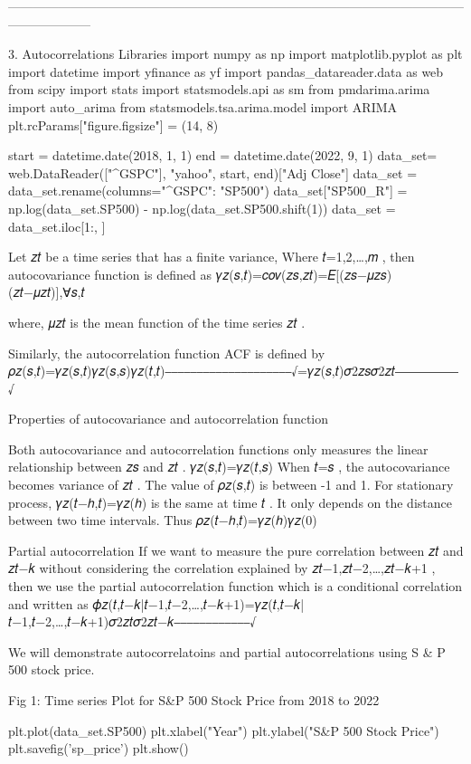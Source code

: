 --------------------------------------------------------------------------------------------------------------------------------


3. Autocorrelations
Libraries
import numpy as np import matplotlib.pyplot as plt import datetime import yfinance as yf import pandas_datareader.data as web from scipy import stats import statsmodels.api as sm from pmdarima.arima import auto_arima from statsmodels.tsa.arima.model import ARIMA plt.rcParams["figure.figsize"] = (14, 8)

start = datetime.date(2018, 1, 1) end = datetime.date(2022, 9, 1) data_set= web.DataReader(["^GSPC"], "yahoo", start, end)["Adj Close"] data_set = data_set.rename(columns={"^GSPC": "SP500"}) data_set["SP500_R"] = np.log(data_set.SP500) - np.log(data_set.SP500.shift(1)) data_set = data_set.iloc[1:, ]

Let  {𝑧𝑡}  be a time series that has a finite variance, Where  𝑡=1,2,…,𝑚 , then autocovariance function is defined as
𝛾𝑧(𝑠,𝑡)=𝑐𝑜𝑣(𝑧𝑠,𝑧𝑡)=𝐸[(𝑧𝑠−𝜇𝑧𝑠)(𝑧𝑡−𝜇𝑧𝑡)],∀𝑠,𝑡
 
where,  𝜇𝑧𝑡  is the mean function of the time series  {𝑧𝑡} .

Similarly, the autocorrelation function ACF is defined by
𝜌𝑧(𝑠,𝑡)=𝛾𝑧(𝑠,𝑡)𝛾𝑧(𝑠,𝑠)𝛾𝑧(𝑡,𝑡)⎯⎯⎯⎯⎯⎯⎯⎯⎯⎯⎯⎯⎯⎯⎯⎯⎯⎯⎯⎯√=𝛾𝑧(𝑠,𝑡)𝜎2𝑧𝑠𝜎2𝑧𝑡⎯⎯⎯⎯⎯⎯⎯⎯⎯⎯√
 
Properties of autocovariance and autocorrelation function

Both autocovariance and autocorrelation functions only measures the linear relationship between  𝑧𝑠  and  𝑧𝑡 .
𝛾𝑧(𝑠,𝑡)=𝛾𝑧(𝑡,𝑠) 
When  𝑡=𝑠 , the autocovariance becomes variance of  𝑧𝑡 .
The value of  𝜌𝑧(𝑠,𝑡)  is between -1 and 1.
For stationary process,  𝛾𝑧(𝑡−ℎ,𝑡)=𝛾𝑧(ℎ)  is the same at time  𝑡 . It only depends on the distance between two time intervals. Thus
𝜌𝑧(𝑡−ℎ,𝑡)=𝛾𝑧(ℎ)𝛾𝑧(0)
 
Partial autocorrelation
If we want to measure the pure correlation between  𝑧𝑡  and  𝑧𝑡−𝑘  without considering the correlation explained by  𝑧𝑡−1,𝑧𝑡−2,…,𝑧𝑡−𝑘+1 , then we use the partial autocorrelation function which is a conditional correlation and written as
𝜙𝑧(𝑡,𝑡−𝑘|𝑡−1,𝑡−2,…,𝑡−𝑘+1)=𝛾𝑧(𝑡,𝑡−𝑘|𝑡−1,𝑡−2,…,𝑡−𝑘+1)𝜎2𝑧𝑡𝜎2𝑧𝑡−𝑘⎯⎯⎯⎯⎯⎯⎯⎯⎯⎯⎯⎯√
 
We will demonstrate autocorrelatoins and partial autocorrelations using S & P 500 stock price.

Fig 1: Time series Plot for S&P 500 Stock Price from 2018 to 2022

plt.plot(data_set.SP500)
plt.xlabel("Year")
plt.ylabel("S&P 500 Stock Price")
plt.savefig('sp_price')
plt.show()

